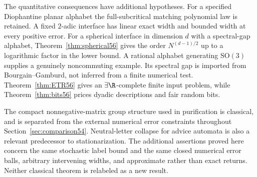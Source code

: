 The quantitative consequences have additional hypotheses. For a specified Diophantine planar alphabet the full-subcritical matching polynomial law is retained. A fixed $2$-adic interface has linear exact width and bounded width at every positive error. For a spherical interface in dimension $d$ with a spectral-gap alphabet, Theorem~\ref{thm:spherical56} gives the order $N^{(d-1)/2}$ up to a logarithmic factor in the lower bound. A rational alphabet generating $\mathrm{SO}(3)$ supplies a genuinely noncommuting example. Its spectral gap is imported from Bourgain--Gamburd, not inferred from a finite numerical test. Theorem~\ref{thm:ETR56} gives an $\exists\R$-complete finite input problem, while Theorem~\ref{thm:bits56} prices dyadic descriptions and fair random bits.

The compact nonnegative-matrix group structure used in purification is classical, and is separated from the external numerical error constraints throughout Section~\ref{sec:comparison54}. Neutral-letter collapse for advice automata is also a relevant predecessor to stationarization. The additional assertions proved here concern the same stochastic label bound and the same closed numerical error balls, arbitrary intervening widths, and approximate rather than exact returns. Neither classical theorem is relabeled as a new result.

